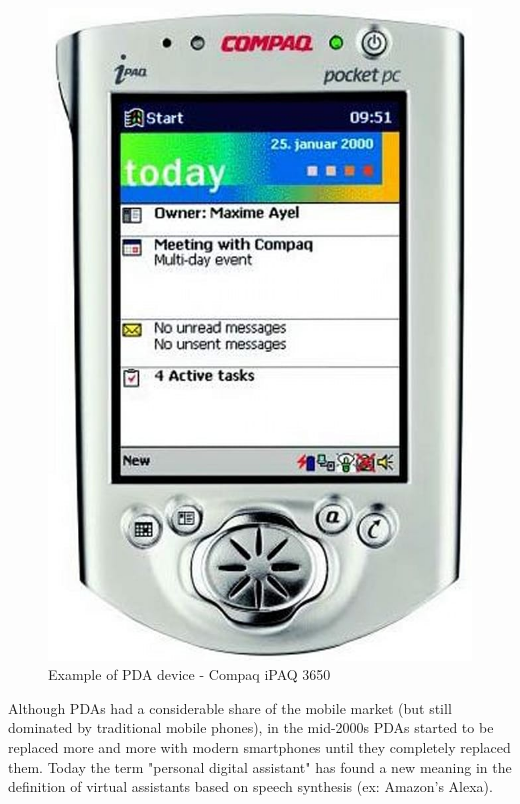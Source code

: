 \begin{figure}[!ht]
    \centering
    \includegraphics[scale=0.3]{document/chapters/chapter_1/images/compaq_ipaq_3650.jpg}
    \caption{Example of PDA device - Compaq iPAQ 3650}
    \label{fig:compaq_ipaq_3650}
\end{figure}

Although PDAs had a considerable share of the mobile market (but still dominated by traditional mobile phones), in the mid-2000s PDAs started to be replaced more and more with modern smartphones until they completely replaced them.
Today the term "personal digital assistant" has found a new meaning in the definition of virtual assistants based on speech synthesis (ex: Amazon's Alexa).

